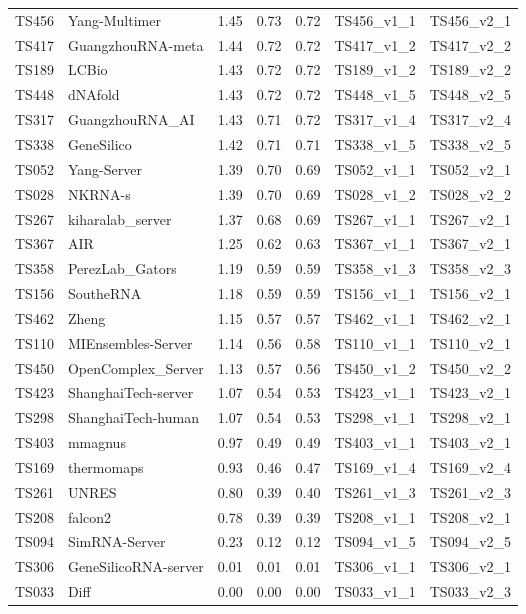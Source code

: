 \begin{table}[ht]
{\begin{tabular}{llrrrll}
TS456 & Yang-Multimer & 1.45 & 0.73 & 0.72 & TS456\_v1\_1 & TS456\_v2\_1 \\ 
TS417 & GuangzhouRNA-meta & 1.44 & 0.72 & 0.72 & TS417\_v1\_2 & TS417\_v2\_2 \\ 
TS189 & LCBio & 1.43 & 0.72 & 0.72 & TS189\_v1\_2 & TS189\_v2\_2 \\ 
TS448 & dNAfold & 1.43 & 0.72 & 0.72 & TS448\_v1\_5 & TS448\_v2\_5 \\ 
TS317 & GuangzhouRNA\_AI & 1.43 & 0.71 & 0.72 & TS317\_v1\_4 & TS317\_v2\_4 \\ 
TS338 & GeneSilico & 1.42 & 0.71 & 0.71 & TS338\_v1\_5 & TS338\_v2\_5 \\ 
TS052 & Yang-Server & 1.39 & 0.70 & 0.69 & TS052\_v1\_1 & TS052\_v2\_1 \\ 
TS028 & NKRNA-s & 1.39 & 0.70 & 0.69 & TS028\_v1\_2 & TS028\_v2\_2 \\ 
TS267 & kiharalab\_server & 1.37 & 0.68 & 0.69 & TS267\_v1\_1 & TS267\_v2\_1 \\ 
TS367 & AIR & 1.25 & 0.62 & 0.63 & TS367\_v1\_1 & TS367\_v2\_1 \\ 
TS358 & PerezLab\_Gators & 1.19 & 0.59 & 0.59 & TS358\_v1\_3 & TS358\_v2\_3 \\ 
TS156 & SoutheRNA & 1.18 & 0.59 & 0.59 & TS156\_v1\_1 & TS156\_v2\_1 \\ 
TS462 & Zheng & 1.15 & 0.57 & 0.57 & TS462\_v1\_1 & TS462\_v2\_1 \\ 
TS110 & MIEnsembles-Server & 1.14 & 0.56 & 0.58 & TS110\_v1\_1 & TS110\_v2\_1 \\ 
TS450 & OpenComplex\_Server & 1.13 & 0.57 & 0.56 & TS450\_v1\_2 & TS450\_v2\_2 \\ 
TS423 & ShanghaiTech-server & 1.07 & 0.54 & 0.53 & TS423\_v1\_1 & TS423\_v2\_1 \\ 
TS298 & ShanghaiTech-human & 1.07 & 0.54 & 0.53 & TS298\_v1\_1 & TS298\_v2\_1 \\ 
TS403 & mmagnus & 0.97 & 0.49 & 0.49 & TS403\_v1\_1 & TS403\_v2\_1 \\ 
TS169 & thermomaps & 0.93 & 0.46 & 0.47 & TS169\_v1\_4 & TS169\_v2\_4 \\ 
TS261 & UNRES & 0.80 & 0.39 & 0.40 & TS261\_v1\_3 & TS261\_v2\_3 \\ 
TS208 & falcon2 & 0.78 & 0.39 & 0.39 & TS208\_v1\_1 & TS208\_v2\_1 \\ 
TS094 & SimRNA-Server & 0.23 & 0.12 & 0.12 & TS094\_v1\_5 & TS094\_v2\_5 \\ 
TS306 & GeneSilicoRNA-server & 0.01 & 0.01 & 0.01 & TS306\_v1\_1 & TS306\_v2\_1 \\ 
TS033 & Diff & 0.00 & 0.00 & 0.00 & TS033\_v1\_1 & TS033\_v2\_3 \\ 
\bottomrule
\end{tabular}%
}
\end{table}
